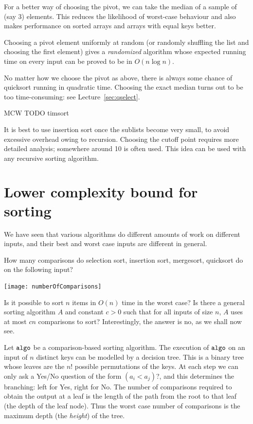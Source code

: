 For a better way of choosing the pivot, we can take the median of a sample of (say 3) elements. This reduces the 
likelihood of worst-case behaviour and also makes performance on sorted arrays 
and arrays with equal keys better. 

Choosing a pivot element uniformly at random (or randomly shuffling the list and choosing the first element) 
gives a \emph{randomized} 
algorithm whose expected running time on every input can be proved to be in 
$O(n \log n)$. 

No matter how we choose the pivot as above, there is always some chance of quicksort running in quadratic time. Choosing the exact median turns out to be too time-consuming: see Lecture~\ref{sec:qselect}.

MCW TODO  timsort

It is best to use insertion sort once the sublists become very small, to 
avoid excessive overhead owing to recursion. Choosing the cutoff point requires 
more detailed analysis; somewhere around 10 is often used. This idea can be used with any recursive sorting algorithm.

\chapter{Lower complexity bound for sorting} %
\label{sec:lowerbound}

We have seen that various algorithms do different amounts of work on different inputs, and their best and worst case inputs are different in general.

\begin{Boxample}
How many comparisons do selection sort, insertion sort, mergesort, quicksort do on the following input?
\begin{center}
\texttt{[image: numberOfComparisons]}
\end{center}
\end{Boxample} 

Is it possible to sort $n$ items in $O(n)$ time in the worst case? Is there a general sorting algorithm $A$ and constant $c>0$ such that for all inputs of size $n$, $A$ uses at most $cn$ comparisons to sort? Interestingly, the answer is no, as we shall now see.

Let $\algo$ be a comparison-based sorting algorithm. The execution
of $\algo$ on an input of $n$ distinct keys can be modelled by a
{decision tree}. This is a binary tree whose leaves are the
$n!$ possible permutations of the keys. At each step we can only ask a Yes/No 
question of the form $(a_i < a_j)$?, and this determines the branching: left for
 Yes, right for No. The number of comparisons required to obtain the output at a leaf is the 
length of the path from the root to that leaf (the {depth} of the leaf 
node). Thus the worst case number of comparisons is the maximum depth (the \emph{height}) of the tree.

